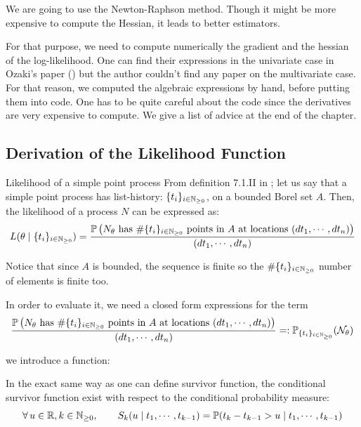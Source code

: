 \documentclass[11pt]{book}
\newcommand{\sequence}[1]{\{ #1 \}_{ i \in \N} }
\begin{document}
We are going to use the Newton-Raphson method. Though it might be more expensive to compute the Hessian, it leads to better estimators.


For that purpose, we need to compute numerically the gradient and the hessian of the log-likelihood. One can find their expressions in the univariate case in Ozaki's paper (\cite{Ozaki}) but the author couldn't find any paper on the multivariate case. For that reason, we computed the algebraic expressions by hand, before putting them into code. One has to be quite careful about the code since the derivatives are very expensive to compute. We give a list of advice at the end of the chapter.





\subsection{Derivation of the Likelihood Function}
\begin{theoreme}{Likelihood of a simple point process}
From definition 7.1.II in \cite{daley}; let us say that a simple point process has list-history: $\sequence{ t_i }$, on a bounded Borel set $A$. Then, the likelihood of a process $N$ can be expressed as:
\begin{equation}
L( \theta \mid \sequence{t_i} ) =  \frac{\mathbb P \left (N_{\theta}  \text{ has } \# \sequence{t_i} \text{ points in } A \text{ at locations  } (d t_1, \cdots, d t_n) \right ) } {(d t_1, \cdots, d t_n)}
\end{equation}

Notice that since $A$ is bounded, the sequence is finite so the $\#\sequence{t_i}$ number of elements is finite too. 
\end{theoreme}




In order to evaluate it, we need a closed form expressions for the term $$\frac{\mathbb P \left (N_{\theta}  \text{ has } \# \sequence{t_i} \text{ points in } A \text{ at locations  } (d t_1, \cdots, d t_n) \right ) } {(d t_1, \cdots, d t_n)}  =: \mathbb P_{\sequence{t_i}} ( \mathcal N_{\theta} ) $$

we introduce a function:
\begin{definition}
\label{def:conditional_survivor_functions}
In the exact same way as one can define survivor function, the conditional survivor function exist with respect to the conditional probability measure:
\begin{equation}
\forall u \in \R, k \in \N, \qquad S_k ( u \mid t_1, \cdots, t_{k-1} ) = \mathbb P ( t_k - t_{k-1} > u \mid t_1, \cdots, t_{k-1} ) 
\end{equation}
\end{definition}
\end{document}
